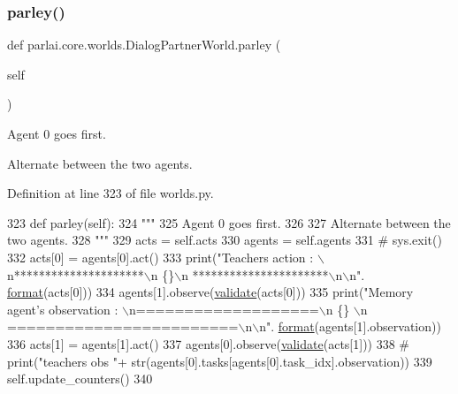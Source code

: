 \subsubsection{\texorpdfstring{parley()}{parley()}}
{\footnotesize\ttfamily def parlai.\+core.\+worlds.\+Dialog\+Partner\+World.\+parley (\begin{DoxyParamCaption}\item[{}]{self }\end{DoxyParamCaption})}

\begin{DoxyVerb}Agent 0 goes first.

Alternate between the two agents.
\end{DoxyVerb}
 

Definition at line 323 of file worlds.\+py.


\begin{DoxyCode}
323     \textcolor{keyword}{def }parley(self):
324         \textcolor{stringliteral}{"""}
325 \textcolor{stringliteral}{        Agent 0 goes first.}
326 \textcolor{stringliteral}{}
327 \textcolor{stringliteral}{        Alternate between the two agents.}
328 \textcolor{stringliteral}{        """}
329         acts = self.acts
330         agents = self.agents
331         \textcolor{comment}{# sys.exit()}
332         acts[0] = agents[0].act()
333         print(\textcolor{stringliteral}{"Teachers action : \(\backslash\)n*********************\(\backslash\)n \{\}\(\backslash\)n **********************\(\backslash\)n\(\backslash\)n"}.
      \hyperlink{namespaceparlai_1_1chat__service_1_1services_1_1messenger_1_1shared__utils_a32e2e2022b824fbaf80c747160b52a76}{format}(acts[0]))
334         agents[1].observe(\hyperlink{namespaceparlai_1_1core_1_1worlds_afc3fad603b7bce41dbdc9cdc04a9c794}{validate}(acts[0]))
335         print(\textcolor{stringliteral}{"Memory agent's observation : \(\backslash\)n===================\(\backslash\)n \{\} \(\backslash\)n ========================\(\backslash\)n\(\backslash\)n"}.
      \hyperlink{namespaceparlai_1_1chat__service_1_1services_1_1messenger_1_1shared__utils_a32e2e2022b824fbaf80c747160b52a76}{format}(agents[1].observation))
336         acts[1] = agents[1].act()
337         agents[0].observe(\hyperlink{namespaceparlai_1_1core_1_1worlds_afc3fad603b7bce41dbdc9cdc04a9c794}{validate}(acts[1]))
338         \textcolor{comment}{# print("teachers obs "+ str(agents[0].tasks[agents[0].task\_idx].observation))}
339         self.update\_counters()
340 
\end{DoxyCode}
\mbox{\label{classparlai_1_1core_1_1worlds_1_1DialogPartnerWorld_a7cf7d09efbe302c30e885641a0189ae8}} 
